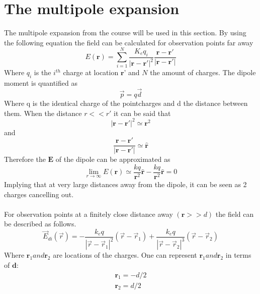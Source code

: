 \section{The multipole expansion}
The multipole expansion from the course will be used in this section. By using the following equation the field can be calculated for observation points far away
\begin{equation}
    E(\textbf{r})= \sum_{i=1}^{N}\frac{K_eq_i}{|\textbf{r}-\textbf{r}'|^2}\frac{\textbf{r}-\textbf{r}'}{|\textbf{r}-\textbf{r}'|}
\end{equation}
Where $q_i$ is the $i^{th}$ charge at location $\textbf{r'}$ and $N$ the amount of charges. The dipole moment is quantified as
\begin{equation}
    \vec{p}=q\vec{d}
\end{equation} 
Where q is the identical charge of the pointcharges and d the distance between them.
When the distance $\displaystyle r << r'$ it can be said that
\begin{equation}
    |\textbf{r}-\textbf{r}'|^2 \simeq \textbf{r}^2 
\end{equation}
and
\begin{equation}
    \frac{\textbf{r}-\textbf{r}'}{|\textbf{r}-\textbf{r}'|} \simeq \hat{\textbf{r}}
\end{equation}
Therefore the $\textbf{E}$ of the dipole can be approximated as
\begin{equation}
    \lim_{r\rightarrow \infty} E(\textbf{r})\simeq \frac{kq}{\textbf{r}^2}\hat{\textbf{r}}-\frac{kq}{\textbf{r}^2}\hat{\textbf{r}}=0
\end{equation}
Implying that at very large distances away from the dipole, it can be seen as 2 charges cancelling out.\\
\\
\noindent For observation points at a finitely close distance away $(\textbf{r}>>d)$ the field can be described as follows.
\begin{equation}
\vec{E}_{d i}(\vec{r})=-\frac{k_{e} q}{\left|\vec{r}-\vec{r}_{1}\right|^{2}}\left(\vec{r}-\vec{r}_{1}\right)+\frac{k_{e} q}{\left|\vec{r}-\vec{r}_{2}\right|^{3}}\left(\vec{r}-\vec{r}_{2}\right)
\end{equation}
Where $\textbf{r}_1 and \textbf{r}_2$ are locations of the charges. One can represent $\textbf{r}_1 and \textbf{r}_2$ in terms of $\textbf{d}$:
\begin{equation}
    \begin{array}{l}
      \textbf{r}_1 = -d/2 \\
      \textbf{r}_2 = d/2
    \end{array}
\end{equation}
